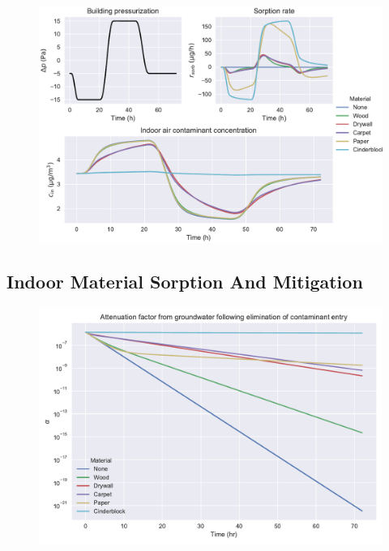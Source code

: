 \begin{figure}[!htb]
  \includegraphics[width=\textwidth]{sorption_indoor_cycle.pdf}
  \caption{}
  \label{fig:indoor_sorption_cycle}
\end{figure}


\subsection{Indoor Material Sorption And Mitigation}


\begin{figure}[!htb]
  \includegraphics[width=\textwidth]{sorption_mitigation.pdf}
  \caption{}
  \label{fig:sorption_mitigation}
\end{figure}
